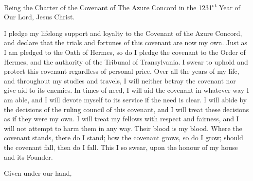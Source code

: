 \documentclass [a3paper,portrait,20pt]{article}
\begin{document}
\setlength{\columnsep}{8mm}
\setlength{\parskip}{0.1em}
\pagestyle{empty}
\title{\fontsize{100}{120}\selectfont{The Oath of Covenant of the Azure Concord}}
\author{\Huge Ashe of Criamon}
\date{\Huge 21\textsuperscript{st} December 1231}
\maketitle
{}
\Large{{Being the Charter of the Covenant of The Azure Concord in the 1231\textsuperscript{st} Year of Our Lord, Jesus Christ.}}

\vspace*{5mm}
\noindent
\Large{I pledge my lifelong support and loyalty to the Covenant of the Azure Concord, and declare that the
	trials and fortunes of this covenant are now my own. Just as I am pledged to the Oath of Hermes, so
	do I pledge the covenant to the Order of Hermes, and the authority of the Tribunal of Transylvania.
	I swear to uphold and protect this covenant regardless of personal price. Over all the years of my
	life, and throughout my studies and travels, I will neither betray the covenant nor give aid to its
	enemies. In times of need, I will aid the covenant in whatever way I am able, and I will devote 
	myself to its service if the need is clear. I will abide by the decisions of the ruling council of
	this covenant, and I will treat these decisions as if they were my own. I will treat my fellows with
	respect and fairness, and I will not attempt to harm them in any way. Their blood is my blood. Where
	the covenant stands, there do I stand; how the covenant grows, so do I grow; should the covenant
	fall, then do I fall. This I so swear, upon the honour of my house and its Founder.}

\huge{Given under our hand,}

\vspace{105mm}
\end{document}
